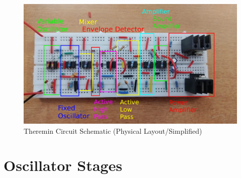 \documentclass[conference]{IEEEtran}
\begin{document}
\begin{figure}[htbp]
    \centering
    \includegraphics[width=0.95\linewidth]{physical_cirucit.png} %
    \caption{Theremin Circuit Schematic (Physical Layout/Simplified)}
    \label{fig:physical_circuit_overview}
\end{figure}

\section{Oscillator Stages}
\end{document}
